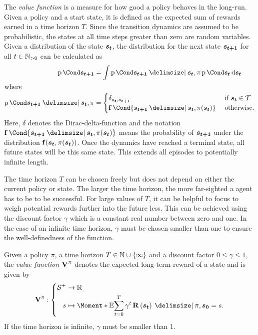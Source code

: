 The \emph{value function} is a measure for how good a policy behaves in the long-run.
Given a policy and a start state, it is defined as the expected sum of rewards earned in a time horizon $T$.
Since the transition dynamics are assumed to be probabilistic, the states at all time steps greater than zero are random variables.
Given a distribution of the state $\bm{s_t}$, the distribution for the next state $\bm{s_{t+1}}$ for all $t \in \mathbb{N}_{>0}$ can be calculated as
\begin{align}
    \Prob{\rv{s_{t+1}}} &= \int \Prob{\rv{s_{t+1}} \given \rv{s_t}, \pi}\Prob{\rv{s_t}} \diff \rv{s_t} \\
    \intertext{where}
    \Prob{\rv{s_{t+1}} \given \rv{s_t}, \pi} &= \begin{cases}
        \delta_{\rv{s_t}, \rv{s_{t+1}}} & \text{ if $\rv{s_t} \in \Tee$} \\
        \Dyn\Cond{\rv{s_{t+1}} \given \rv{s_t}, \pi(\rv{s_t})} & \text{ otherwise.}
    \end{cases}
\end{align}
Here, $\delta$ denotes the Dirac-delta-function and the notation $\Dyn\Cond{\rv{s_{t+1}} \given \rv{s_t}, \pi(\rv{s_t})}$ means the probability of $\bm{s_{t+1}}$ under the distribution $\Dyn(\rv{s_t}, \pi(\rv{s_t}))$.
Once the dynamics have reached a terminal state, all future states will be this same state.
This extends all episodes to potentially infinite length.

The time horizon $T$ can be chosen freely but does not depend on either the current policy or state.
The larger the time horizon, the more far-sighted a agent has to be to be successful.
For large values of $T$, it can be helpful to focus to weigh potential rewards further into the future less.
This can be achieved using the discount factor $\gamma$ which is a constant real number between zero and one.
In the case of an infinite time horizon, $\gamma$ must be chosen smaller than one to ensure the well-definedness of the function.

\begin{definition}
    Given a policy $\pi$, a time horizon $T \in \mathbb{N} \cup \left\{ \infty \right\}$ and a discount factor $0 \leq \gamma \leq 1$, the \emph{value function $\Vlu^\pi$} denotes the expected long-term reward of a state and is given by
    \begin{align}
        \Vlu^\pi : \left\{
            \begin{aligned}
                \Es^+ &\to \R \\
                s &\mapsto \Moment*{\E}{\sum_{t=0}^T \gamma^t \Rwd \left( \rv{s_t} \right) \given \pi, \rv{s_0} = s }.
            \end{aligned}
        \right.
    \end{align}
    If the time horizon is infinite, $\gamma$ must be smaller than 1.
\end{definition}

